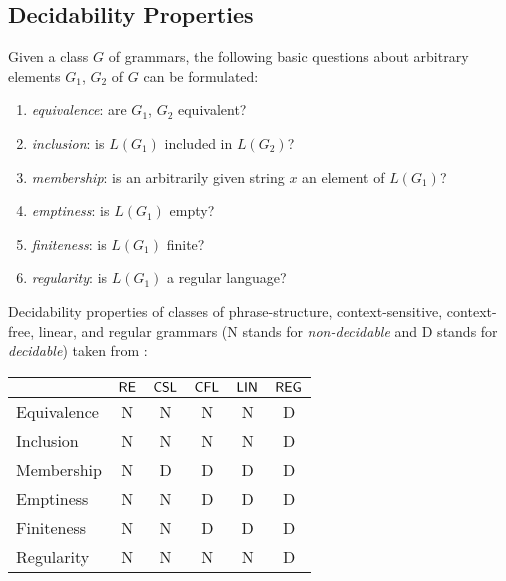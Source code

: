 \subsection{Decidability Properties}
\label{subsection:decidability-properties}

Given a class $G$ of grammars, the following basic questions about arbitrary
elements $G_1$, $G_2$ of $G$ can be formulated:

\begin{enumerate}
\item {}\emph{equivalence}: are $G_1$, $G_2$ equivalent?
\item {}\emph{inclusion}: is $L(G_1)$ included in $L(G_2)$?
\item {}\emph{membership}: is an arbitrarily given string $x$ an
element of $L(G_1)$?
\item {}\emph{emptiness}: is $L(G_1)$ empty?
\item {}\emph{finiteness}: is $L(G_1)$ finite?
\item {}\emph{regularity}: is $L(G_1)$ a regular language?
\end{enumerate}

Decidability properties of classes of phrase-structure,
context-sensitive, context-free, linear, and regular grammars (N stands for
\emph{non-decidable} and D stands for \emph{decidable}) taken from \citep{MaSa1997formal}:

\begin{center}
\begin{tabular}{ | l | c | c | c | c | c | }
\hline
              & $\textup{\sf RE}$
              & $\textup{\sf CSL}$
              & $\textup{\sf CFL}$
              & $\textup{\sf LIN}$
              & $\textup{\sf REG}$\\
\hline
\index{equivalence}Equivalence
              & N     & N      & N      & N      & D \\
\hline
\index{inclusion}Inclusion
              & N     & N      & N      & N      & D \\
\hline
\index{membership}Membership
              & N     & D      & D      & D      & D \\
\hline
\index{emptiness}Emptiness
              & N     & N      & D      & D      & D \\
\hline
\index{finiteness}Finiteness
              & N     & N      & D      & D      & D \\
\hline
\index{regularity}Regularity
              & N     & N      & N      & N      & D \\
\hline
\end{tabular}
\end{center}
